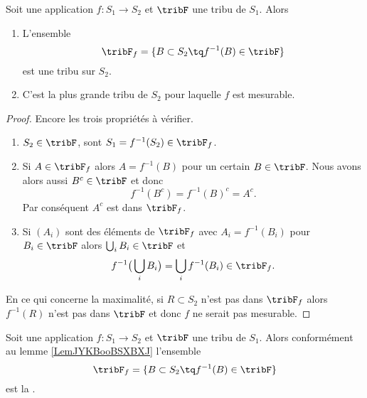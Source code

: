 \begin{lemma}       \label{LemJYKBooBSXBXJ}
    Soit une application \( f\colon S_1\to S_2\) et \( \tribF\) une tribu de \( S_1\). Alors
    \begin{enumerate}
        \item
            L'ensemble
            \begin{equation}
                \tribF_f=\{  B\subset S_2\tq f^{-1}(B)\in \tribF  \}
            \end{equation}
            est une tribu sur \( S_2\).
        \item
            C'est la plus grande tribu de \( S_2\) pour laquelle \( f\) est mesurable.
    \end{enumerate}
\end{lemma}

\begin{proof}
    Encore les trois propriétés à vérifier.
    \begin{enumerate}
        \item
            \( S_2\in\tribF\), sont \( S_1=f^{-1}(S_2)\in \tribF_f\).
        \item
            Si \( A\in \tribF_f\) alors \( A=f^{-1}(B)\) pour un certain \( B\in \tribF\). Nous avons alors aussi \( B^c\in \tribF\) et donc 
            \begin{equation}
                f^{-1}(B^c)=f^{-1}(B)^c=A^c.
            \end{equation}
            Par conséquent \( A^c\) est dans \( \tribF_f\).
        \item
            Si \( (A_i)\) sont des éléments de \( \tribF_f\) avec \( A_i=f^{-1}(B_i)\) pour \( B_i\in \tribF\) alors \( \bigcup_iB_i\in\tribF\) et
            \begin{equation}
                f^{-1}\big( \bigcup_iB_i \big)=\bigcup_if^{-1}(B_i)\in\tribF_f.
            \end{equation}
    \end{enumerate}
    En ce qui concerne la maximalité, si \( R\subset S_2\) n'est pas dans \( \tribF_f\) alors \( f^{-1}(R)\) n'est pas dans \( \tribF\) et donc \( f\) ne serait pas mesurable.
\end{proof}

\begin{definition} \label{DefNOJWooLGKhmJ}
    Soit une application \( f\colon S_1\to S_2\) et \( \tribF\) une tribu de \( S_1\). Alors conformément au lemme \ref{LemJYKBooBSXBXJ} l'ensemble
            \begin{equation}
                \tribF_f=\{  B\subset S_2\tq f^{-1}(B)\in \tribF  \}
            \end{equation}
            est la .
\end{definition}

